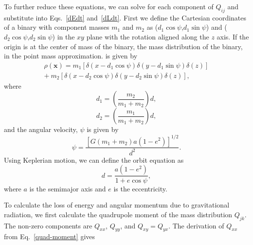 To further reduce these equations, we can solve for each component of $Q_{ij}$ and substitute into Eqs.~\ref{dEdt} and~\ref{dLdt}. First we define the Cartesian coordinates of a binary with component masses $m_1$ and $m_2$ as ($d_1\cos\psi$,$d_1\sin\psi$)  and ($d_2\cos\psi$,$d_2\sin\psi$) in the $xy$ plane with the rotation aligned along the $z$ axis. If the origin is at the center of mass of the binary, the mass distribution of the binary, in the point mass approximation. is given by
\begin{align}
    \rho(\boldsymbol{x}) = m_1[\delta(x-d_1\cos\psi)\delta(y-d_1\sin\psi)\delta(z)] \\ 
    +~m_2[\delta(x-d_2\cos\psi)\delta(y-d_2\sin\psi)\delta(z)],
\end{align}
where 
\begin{equation}
    d_1 = \left( \frac{m_2}{m_1+m_2}\right)d,
\end{equation}
\begin{equation}
    d_2 = \left( \frac{m_1}{m_1+m_2}\right)d,
\end{equation}
and the angular velocity, $\psi$ is given by
\begin{equation}
    \psi = \frac{[G(m_1+m_2)a(1-e^2)]^{1/2}}{d^2}.
\end{equation}
Using Keplerian motion, we can define the orbit equation as
\begin{equation}
    d = \frac{a(1-e^2)}{1+e\cos\psi},
\end{equation}
where $a$ is the semimajor axis and $e$ is the eccentricity. 

To calculate the loss of energy and angular momentum due to gravitational radiation, we first calculate the quadrupole moment of the mass distribution $Q_{jk}$. The non-zero components are $Q_{xx}$, $Q_{yy}$, and $Q_{xy} = Q_{yx}$. The derivation of $Q_{xx}$ from Eq.~\ref{quad-moment} gives

